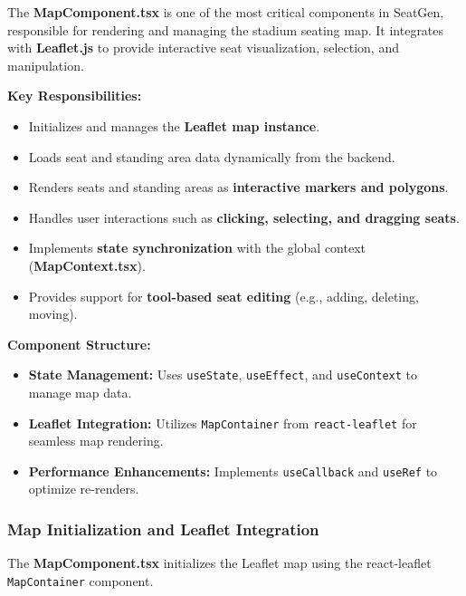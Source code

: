 The \textbf{MapComponent.tsx} is one of the most critical components in SeatGen, responsible for rendering and managing the stadium seating map. It integrates with \textbf{Leaflet.js} to provide interactive seat visualization, selection, and manipulation.

\textbf{Key Responsibilities:}
\begin{itemize}
    \item Initializes and manages the \textbf{Leaflet map instance}.
    \item Loads seat and standing area data dynamically from the backend.
    \item Renders seats and standing areas as \textbf{interactive markers and polygons}.
    \item Handles user interactions such as \textbf{clicking, selecting, and dragging seats}.
    \item Implements \textbf{state synchronization} with the global context (\textbf{MapContext.tsx}).
    \item Provides support for \textbf{tool-based seat editing} (e.g., adding, deleting, moving).
\end{itemize}

\textbf{Component Structure:}
\begin{itemize}
    \item \textbf{State Management:} Uses \texttt{useState}, \texttt{useEffect}, and \texttt{useContext} to manage map data.
    \item \textbf{Leaflet Integration:} Utilizes \texttt{MapContainer} from \texttt{react-leaflet} for seamless map rendering.
    \item \textbf{Performance Enhancements:} Implements \texttt{useCallback} and \texttt{useRef} to optimize re-renders.
\end{itemize}

\subsubsection{Map Initialization and Leaflet Integration}

The \textbf{MapComponent.tsx} initializes the Leaflet map using the react-leaflet \texttt{MapContainer} component.

